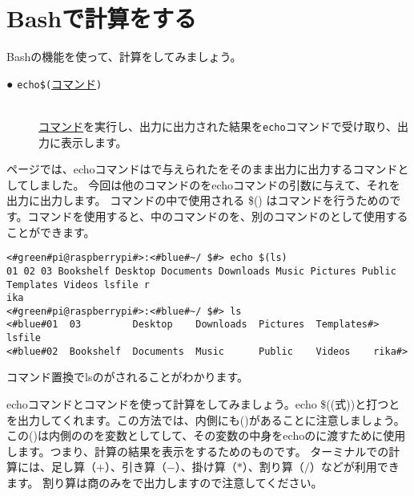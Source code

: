 \newpage
\section{Bashで計算をする}

Bashの機能を使って、計算をしてみましょう。
\begin{description}
    \item[● \texttt{echo}\textvisiblespace\texttt{\$(}\underline{コマンド}\texttt{)}]\mbox{}\\
    \underline{コマンド}を実行し、出力に出力された結果を\texttt{echo}コマンドで受け取り、出力に表示します。
\end{description}

\pageref{cmd:echo}ページでは、echoコマンドはで与えられたをそのまま出力に出力するコマンドとしてしました。
今回は他のコマンドのをechoコマンドの引数に与えて、それを出力に出力します。
コマンドの中で使用される \$() はコマンドを行うためのです。コマンドを使用すると、中のコマンドのを、別のコマンドのとして使用することができます。
\begin{lstlisting}[caption=echo コマンド置換を使った例1, label=cmdsbs:echo]
<#green#pi@raspberrypi#>:<#blue#~/ $#> echo $(ls)
01 02 03 Bookshelf Desktop Documents Downloads Music Pictures Public Templates Videos lsfile r
ika
<#green#pi@raspberrypi#>:<#blue#~/ $#> ls
<#blue#01  03         Desktop    Downloads  Pictures  Templates#> lsfile
<#blue#02  Bookshelf  Documents  Music      Public    Videos    rika#> 
\end{lstlisting}
コマンド置換でlsのがされることがわかります。

echoコマンドとコマンドを使って計算をしてみましょう。echo \$((式))と打つとを出力してくれます。この方法では、内側にも()があることに注意しましょう。この()は内側ののを変数としてして、その変数の中身をechoのに渡すために使用します。つまり、計算の結果を表示をするためのものです。
ターミナルでの計算には、足し算（$+$）、引き算（$-$）、掛け算（$*$）、割り算（$/$）などが利用できます。 割り算は商のみをで出力しますので注意してください。

